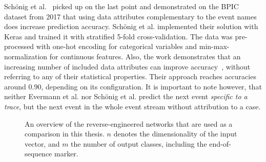 Schönig et al.~\cite{schoenig2018} picked up on the last point and demonstrated on the BPIC dataset from 2017 that using data attributes complementary to the event names does increase prediction accuracy. Schönig et al. implemented their solution with Keras and trained it with stratified 5-fold cross-validation.
The data was pre-processed with one-hot encoding for categorical variables and min-max-normalization for continuous features. Also, the work demonstrates that an increasing number of included data attributes can improve accuracy~\cite[p.5]{schoenig2018}, without referring to any of their statistical properties. Their approach reaches accuracies around $0.90$, depending on its configuration. It is important to note however, that neither Evermann et al. nor Schönig et al. predict the next event \textit{specific to a trace}, but the next event in the whole event stream without attribution to a case.

\begin{figure}
\centering
{}
\qquad
{}
\caption[Overview of the reverse-engineered networks]{An overview of the reverse-engineered networks that are used as a comparison in this thesis. $n$ denotes the dimensionality of the input vector, and $m$ the number of output classes, including the end-of-sequence marker.}
\label{fig:benchmark-architectures}
\end{figure}

